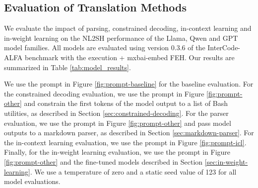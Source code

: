 \documentclass[11pt]{article}
\begin{document}
\subsection{Evaluation of Translation Methods}
\label{sec:experiments-methods}
We evaluate the impact of parsing, constrained decoding, in-context learning and in-weight learning on the NL2SH performance of the Llama, Qwen and GPT model families. All models are evaluated using version 0.3.6 of the InterCode-ALFA benchmark with the execution + mxbai-embed FEH. Our results are summarized in Table \ref{tab:model_results}.

We use the prompt in Figure \ref{fig:prompt-baseline} for the baseline evaluation. For the constrained decoding evaluation, we use the prompt in Figure \ref{fig:prompt-other} and constrain the first tokens of the model output to a list of Bash utilities, as described in Section \ref{sec:constrained-decoding}. For the parser evaluation, we use the prompt in Figure \ref{fig:prompt-other} and pass model outputs to a markdown parser, as described in Section \ref{sec:markdown-parser}. For the in-context learning evaluation, we use the prompt in Figure \ref{fig:prompt-icl}. Finally, for the in-weight learning evaluation, we use the prompt in Figure \ref{fig:prompt-other} and the fine-tuned models described in Section \ref{sec:in-weight-learning}. We use a temperature of zero and a static seed value of 123 for all model evaluations.
\end{document}

